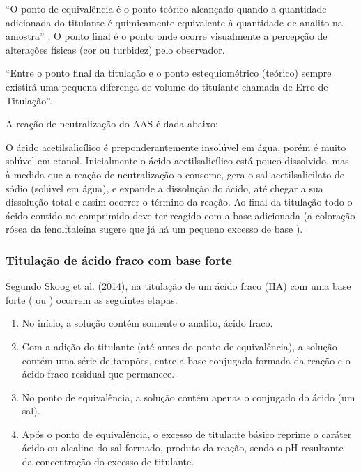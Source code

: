 ``O ponto de equivalência é o ponto teórico alcançado quando a quantidade adicionada do titulante é
quimicamente equivalente à quantidade de analito na amostra'' \cite{Skoog2014}. O ponto final é o
ponto onde ocorre visualmente a percepção de alterações físicas (cor ou turbidez) pelo observador.

“Entre o ponto final da titulação e o ponto estequiométrico (teórico) sempre existirá uma pequena
diferença de volume do titulante chamada de Erro de Titulação”. \cite{Ruy1999}

A reação de neutralização do AAS é dada abaixo:

\begin{center}
\end{center} 

O ácido acetilsalicílico é preponderantemente insolúvel em água, porém é muito solúvel em etanol.
Inicialmente o ácido acetilsalicílico está pouco dissolvido, mas à  medida  que  a  reação  de
neutralização o consome, gera o  sal acetilsalicilato de  sódio (solúvel em água), e expande a
dissolução do ácido, até chegar a sua dissolução total e assim ocorrer o término da reação. Ao final
da titulação todo o ácido contido no comprimido deve ter reagido com a base adicionada (a coloração
rósea da fenolftaleína sugere que já há um pequeno excesso de base ).

\subsubsection{Titulação de ácido fraco com base forte}

Segundo Skoog et al. (2014), na titulação de um ácido fraco (HA) com uma base forte ( ou
) ocorrem as seguintes etapas:

\begin{enumerate}
    \item No início, a solução contém somente o analito, ácido fraco.
    \item Com a adição do titulante (até antes do ponto de equivalência), a solução contém uma série
        de tampões, entre a base conjugada formada da reação e o ácido fraco residual que permanece.
    \item No ponto de equivalência, a solução contém apenas o conjugado do ácido (um sal).
    \item Após o ponto de equivalência, o excesso de titulante básico reprime o caráter ácido ou
        alcalino do sal formado, produto da reação, sendo o pH resultante da concentração do excesso
        de titulante.
\end{enumerate}

